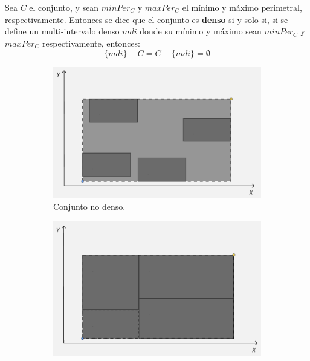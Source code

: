         \begin{center}
            Sea $C$ el conjunto, y sean $minPer_C$ y $maxPer_C$ el mínimo y máximo perimetral, respectivamente. Entonces se dice que el conjunto es \textbf{denso} si y solo si, si se define un multi-intervalo denso $mdi$ donde su mínimo y máximo sean $minPer_C$ y $maxPer_C$ respectivamente, entonces:
                \[
                    \{mdi\} - C = C - \{mdi\} = \emptyset
                \]
        \end{center}
\begin{figure}[h]
    \centering
    \begin{subfigure}[b]{0.42\linewidth}
        \centering
        \includegraphics[width=\linewidth]{figures/optimizaciones pwmap/op simils/denso1.png}
        \caption{Conjunto no denso.}
        \label{fig:crit-suma-dominio}
    \end{subfigure}
    \hfill
    \begin{subfigure}[b]{0.42\linewidth}
        \centering
        \includegraphics[width=\linewidth]{figures/optimizaciones pwmap/op simils/denso2.png}

\end{subfigure}
\end{figure}
